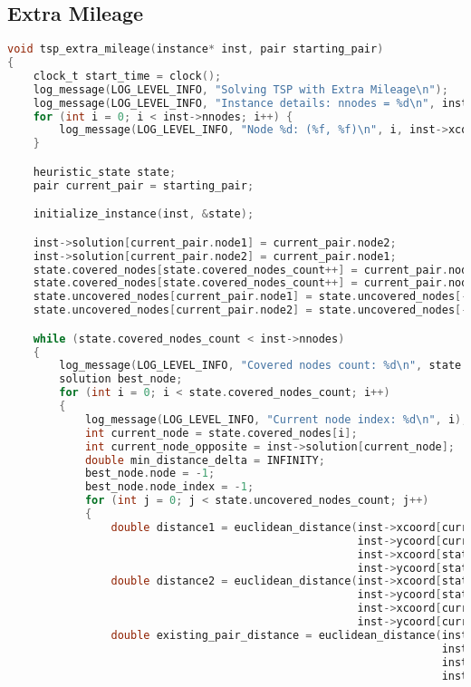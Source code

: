 \subsection{Extra Mileage}
\label{appendix:tsp_extra_mileage}
\begin{lstlisting}[language=C]
void tsp_extra_mileage(instance* inst, pair starting_pair)
{
    clock_t start_time = clock();
    log_message(LOG_LEVEL_INFO, "Solving TSP with Extra Mileage\n");
    log_message(LOG_LEVEL_INFO, "Instance details: nnodes = %d\n", inst->nnodes);
    for (int i = 0; i < inst->nnodes; i++) {
        log_message(LOG_LEVEL_INFO, "Node %d: (%f, %f)\n", i, inst->xcoord[i], inst->ycoord[i]);
    }

    heuristic_state state;
    pair current_pair = starting_pair;

    initialize_instance(inst, &state);

    inst->solution[current_pair.node1] = current_pair.node2;
    inst->solution[current_pair.node2] = current_pair.node1;
    state.covered_nodes[state.covered_nodes_count++] = current_pair.node1;
    state.covered_nodes[state.covered_nodes_count++] = current_pair.node2;
    state.uncovered_nodes[current_pair.node1] = state.uncovered_nodes[--state.uncovered_nodes_count];
    state.uncovered_nodes[current_pair.node2] = state.uncovered_nodes[--state.uncovered_nodes_count];

    while (state.covered_nodes_count < inst->nnodes)
    {
        log_message(LOG_LEVEL_INFO, "Covered nodes count: %d\n", state.covered_nodes_count);
        solution best_node;
        for (int i = 0; i < state.covered_nodes_count; i++)
        {
            log_message(LOG_LEVEL_INFO, "Current node index: %d\n", i);
            int current_node = state.covered_nodes[i];
            int current_node_opposite = inst->solution[current_node];
            double min_distance_delta = INFINITY;
            best_node.node = -1;
            best_node.node_index = -1;
            for (int j = 0; j < state.uncovered_nodes_count; j++)
            {
                double distance1 = euclidean_distance(inst->xcoord[current_node],
                                                      inst->ycoord[current_node],
                                                      inst->xcoord[state.uncovered_nodes[j]],
                                                      inst->ycoord[state.uncovered_nodes[j]], false);
                double distance2 = euclidean_distance(inst->xcoord[state.uncovered_nodes[j]],
                                                      inst->ycoord[state.uncovered_nodes[j]],
                                                      inst->xcoord[current_node_opposite],
                                                      inst->ycoord[current_node_opposite], false);
                double existing_pair_distance = euclidean_distance(inst->xcoord[current_node],
                                                                   inst->ycoord[current_node],
                                                                   inst->xcoord[current_node_opposite],
                                                                   inst->ycoord[current_node_opposite], false);


\end{lstlisting}
